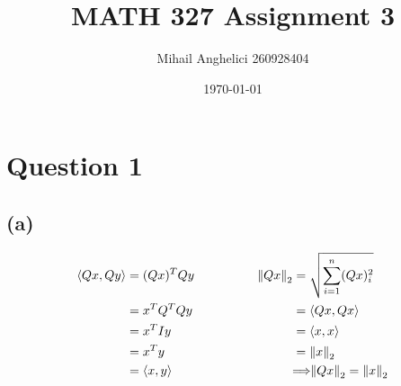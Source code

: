 \documentclass[12pt]{article}
\title{MATH 327 Assignment 3}
\author{Mihail Anghelici 260928404 }
\date{\today}
\newcommand{\la}{\langle} \newcommand{\ra}{\rangle}
\let\oldimplies\implies
\renewcommand*{\implies}{
	\hspace{-0.05cm}\resizebox{.95\width}{\height}{$\oldimplies$}\hspace{-0.05cm}
}
\begin{document}
	\maketitle
	\section*{Question 1}
		\subsection*{(a)}
			\begin{align*}
				\la Qx , Qy \ra &= (Qx)^{T}Qy \qquad\qquad& \norm{Qx}_{2} &=\sqrt{\sum_{i=1}^{n} (Qx)_{i}^{2}} \\ 
				&= x^{T}Q^{T}Qy \qquad\qquad& &=\la Qx, Qx \ra \\
				&= x^{T}Iy \qquad\qquad& &= \la x , x \ra \\
				&= x^{T}y \qquad\qquad& &= \norm{x}_{2}\\
				&= \la x , y \ra \qquad\qquad& &\implies \norm{Qx}_{2} = \norm{x}_{2}
			\end{align*}
\end{document}

